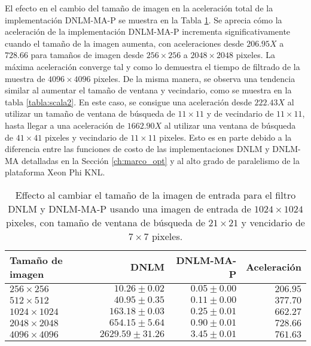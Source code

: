 El efecto en el cambio del tama\~no de imagen en la aceleración total de la implementación DNLM-MA-P se muestra en la Tabla \ref{tabla:scala1}. Se aprecia cómo la aceleración de la implementación DNLM-MA-P incrementa significativamente cuando el tama\~no de la imagen aumenta, con aceleraciones desde $206.95X$ a $728.66$ para tama\~nos de imagen desde $256 \times 256$ a $2048 \times 2048$ pixeles. La máxima aceleración converge tal y como lo demuestra el tiempo de filtrado de la muestra de $4096\times 4096$ pixeles.  
De la misma manera, se observa una tendencia similar al aumentar el tama\~no de ventana y vecindario, como se muestra en la tabla \ref{tabla:scala2}. En este caso, se consigue una aceleración desde $222.43X$ al utilizar un tama\~no de ventana de búsqueda de $11 \times 11$ y de vecindario de $11 \times 11$, hasta llegar a una aceleración de $1662.90X$ al utilizar una ventana de búsqueda de $41 \times 41$ pixeles y vecindario de $11 \times 11$ pixeles. Esto es en parte debido a la diferencia entre las funciones de costo de las implementaciones DNLM y DNLM-MA detalladas en la Sección \ref{ch:marco_opt} y al alto grado de paralelismo de la plataforma Xeon Phi KNL.


\begin{table}
\protect\caption[Efecto al cambiar tama\~no de imagen de entrada]{Effecto al cambiar el tama\~no de la imagen de entrada para el filtro DNLM y DNLM-MA-P usando una imagen de entrada de  $1024 \times 1024$ pixeles, con tama\~no de ventana de búsqueda de $21 \times 21$ y vencidario de $7 \times 7$ pixeles. \label{tabla:scala1}}
\centering
\begin{tabular}{lrrr}
Tama\~no de imagen & DNLM \left[s\right]& DNLM-MA-P\left[s\right]& Aceleración \left[x\right] \tabularnewline
\hline
$256 \times 256$ & $10.26\pm0.02$ & $0.05\pm0.00$ & $206.95$ \tabularnewline
$512 \times 512$ & $40.95\pm0.35$ & $0.11\pm0.00$ & $377.70$ \tabularnewline
$1024 \times 1024$ & $163.18\pm0.03$ & $0.25\pm0.01$ & $662.27$ \tabularnewline
$2048 \times 2048$ & $654.15\pm5.64$ & $0.90\pm0.01$ & $728.66$ \tabularnewline
$4096 \times 4096$ & $2629.59\pm31.26$ & $3.45\pm0.01$ & $761.63$ \tabularnewline
\end{tabular}
\end{table}


